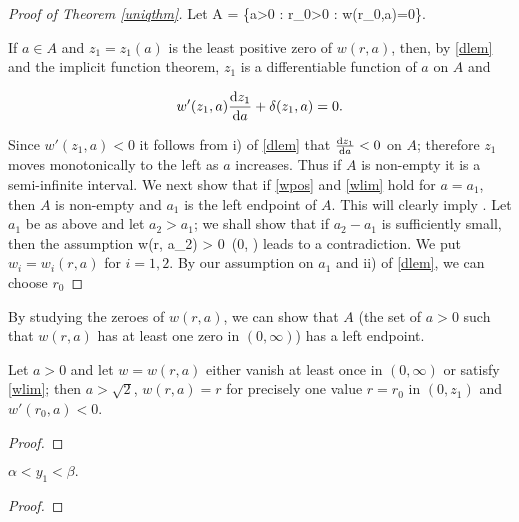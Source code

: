 \begin{proof}[Proof of Theorem \ref{uniqthm}]
    Let
    \be\label{adef}
    A = \left\{a>0 : \exists r_0>0 : w(r_0,a)=0\right\}.
    \ee
    
    If $a\in A$ and $z_1=z_1(a)$ is the least positive zero of $w(r,a)$, then,
    by \cref{dlem} and the implicit function theorem, $z_1$ is a differentiable
    function of $a$ on $A$ and

    $$w'(z_1, a)\frac{\mathop{}\!\mathrm{d} z_1}{\mathop{}\!\mathrm{d} a} + \delta(z_1, a) = 0.$$

    Since $w'(z_1, a)<0$ it follows from i) of \cref{dlem} that $\frac{\mathop{}\!\mathrm{d}
    z_1}{\mathop{}\!\mathrm{d} a}<0$ on $A$; therefore $z_1$ moves monotonically to the left as
    $a$ increases. Thus if $A$ is non-empty it is a semi-infinite interval. We
    next show that if \eqref{wpos} and \eqref{wlim} hold for $a=a_1$, then $A$
    is non-empty and $a_1$ is the left endpoint of $A$. This will clearly imply
    . Let $a_1$ be as above and let $a_2>a_1$; we shall show that
    if $a_2-a_1$ is sufficiently small, then the assumption
    \be\label{wass} w(r, a_2) > 0\quad{}~(0, \infty)\e
    leads to a contradiction. We put $w_i=w_i(r, a)$ for $i=1, 2$. By our
    assumption on $a_1$ and ii) of \cref{dlem}, we can choose $r_0$

\end{proof}

% 
% 
By studying the zeroes of $w(r,a)$, we can show that $A$ (the set of $a>0$
such that $w(r, a)$ has at least one zero in $(0, \infty)$) has a left
endpoint.

\begin{lemma}
Let $a>0$ and let $w=w(r,a)$ either vanish at least once in $(0, \infty)$
    or satisfy \eqref{wlim}; then $a>\sqrt{2}$, $w(r, a)=r$ for precisely one value
$r=r_0$ in $(0, z_1)$ and $w'(r_0, a)<0$.
\end{lemma}
\begin{proof}
\end{proof}

\begin{lemma}
    $\alpha < y_1 < \beta.$
\end{lemma}
\begin{proof}
\end{proof}

